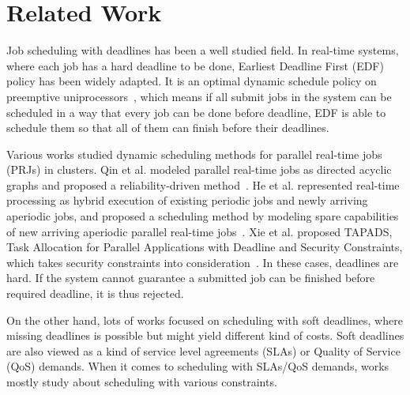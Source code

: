 \chapter{Related Work}\label{sec:related}

Job scheduling with deadlines has been a well studied field.
In real-time systems, where each job has a hard deadline to be done,
Earliest Deadline First (EDF) policy has been widely adapted.
It is an optimal dynamic schedule policy on preemptive
uniprocessors~\cite{cite:pinedo2012scheduling}, which means if all
submit jobs in the system can be scheduled in a way that every job can
be done before deadline, EDF is able to schedule them so that all of
them can finish before their deadlines.

Various works studied dynamic scheduling methods for parallel real-time
jobs (PRJs) in clusters.
Qin et al. modeled parallel real-time jobs as directed acyclic graphs
and proposed a reliability-driven
method~\cite{cite:qin-reliability-driven}.
He et al. represented real-time processing as hybrid execution of
existing periodic jobs and newly arriving aperiodic jobs, and proposed a
scheduling method by modeling spare capabilities of new arriving
aperiodic parallel real-time jobs~\cite{cite:he-spare-capabilities}.
Xie et al. proposed TAPADS, Task Allocation for Parallel Applications
with Deadline and Security Constraints, which takes security constraints
into consideration~\cite{cite:xie-TAPADS,cite:xie2008security}.
In these cases, deadlines are hard.
If the system cannot guarantee a submitted job can be finished before
required deadline, it is thus rejected.

On the other hand, lots of works focused on scheduling with soft
deadlines, where missing deadlines is possible but might yield different
kind of costs.
Soft deadlines are also viewed as a kind of service level agreements
(SLAs) or Quality of Service (QoS) demands.
When it comes to scheduling with SLAs/QoS demands, works mostly study
about scheduling with various constraints.


